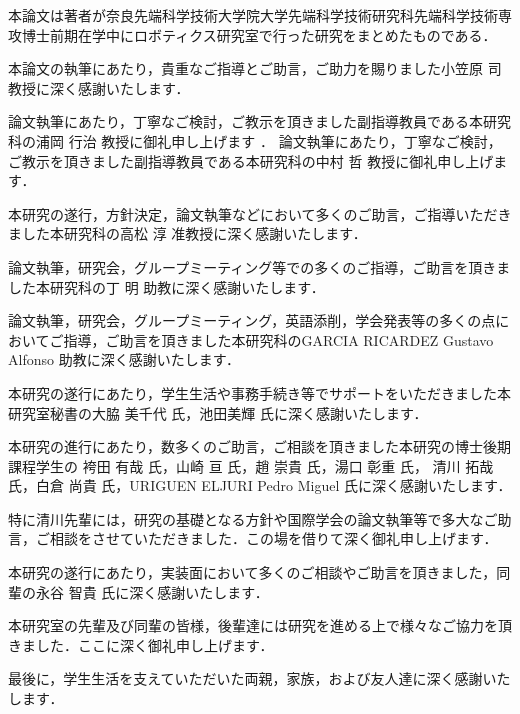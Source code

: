 \acknowledgements
本論文は著者が奈良先端科学技術大学院大学先端科学技術研究科先端科学技術専攻博士前期在学中にロボティクス研究室で行った研究をまとめたものである．

本論文の執筆にあたり，貴重なご指導とご助言，ご助力を賜りました小笠原 司 教授に深く感謝いたします．

論文執筆にあたり，丁寧なご検討，ご教示を頂きました副指導教員である本研究科の浦岡 行治 教授に御礼申し上げます
．
論文執筆にあたり，丁寧なご検討，ご教示を頂きました副指導教員である本研究科の中村 哲 教授に御礼申し上げます．

本研究の遂行，方針決定，論文執筆などにおいて多くのご助言，ご指導いただきました本研究科の高松 淳 准教授に深く感謝いたします．

論文執筆，研究会，グループミーティング等での多くのご指導，ご助言を頂きました本研究科の丁 明 助教に深く感謝いたします．

論文執筆，研究会，グループミーティング，英語添削，学会発表等の多くの点においてご指導，ご助言を頂きました本研究科のGARCIA RICARDEZ Gustavo Alfonso 助教に深く感謝いたします．

本研究の遂行にあたり，学生生活や事務手続き等でサポートをいただきました本研究室秘書の大脇 美千代 氏，池田美輝 氏に深く感謝いたします．

本研究の進行にあたり，数多くのご助言，ご相談を頂きました本研究の博士後期課程学生の	
袴田 有哉 氏，山崎 亘 氏，趙 崇貴 氏，湯口 彰重 氏， 清川 拓哉 氏，白倉 尚貴 氏，URIGUEN ELJURI Pedro Miguel   氏に深く感謝いたします．

特に清川先輩には，研究の基礎となる方針や国際学会の論文執筆等で多大なご助言，ご相談をさせていただきました．この場を借りて深く御礼申し上げます．

本研究の遂行にあたり，実装面において多くのご相談やご助言を頂きました，同輩の永谷 智貴 氏に深く感謝いたします．

本研究室の先輩及び同輩の皆様，後輩達には研究を進める上で様々なご協力を頂きました．ここに深く御礼申し上げます．

最後に，学生生活を支えていただいた両親，家族，および友人達に深く感謝いたします．



\newpage
